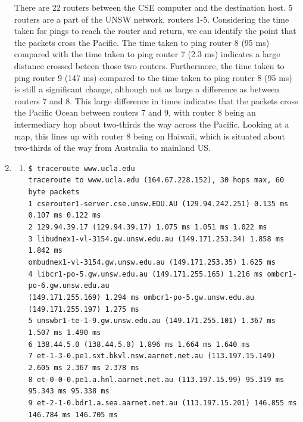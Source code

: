 \documentclass[a4paper,11pt]{article}
\newcommand{\code}{\texttt}
\begin{document}
\begin{enumerate}[leftmargin=*]
	There are 22 routers between the CSE computer and the destination host. 5 routers are a part of the UNSW network, routers 1-5. Considering the time taken for pings to reach the router and return, we can identify the point that the packets cross the Pacific. The time taken to ping router 8 (95 ms) compared with the time taken to ping router 7 (2.3 ms) indicates a large distance crossed beteen those two routers. Furthermore, the time taken to ping router 9 (147 ms) compared to the time taken to ping router 8 (95 ms) is still a significant change, although not as large a difference as between routers 7 and 8. This large difference in times indicates that the packets cross the Pacific Ocean between routers 7 and 9, with router 8 being an intermediary hop about two-thirds the way across the Pacific. Looking at a map, this lines up with router 8 being on Haiwaii, which is situated about two-thirds of the way from Australia to mainland US.
	\item 
		\begin{enumerate}
			\item \code{\scriptsize \$ traceroute www.ucla.edu\\
			traceroute to www.ucla.edu (164.67.228.152), 30 hops max, 60 byte packets\\
			 1  cserouter1-server.cse.unsw.EDU.AU (129.94.242.251)  0.135 ms  0.107 ms  0.122 ms\\
			 2  129.94.39.17 (129.94.39.17)  1.075 ms  1.051 ms  1.022 ms\\
			 3  libudnex1-vl-3154.gw.unsw.edu.au (149.171.253.34)  1.858 ms  1.842 ms\\
			 ombudnex1-vl-3154.gw.unsw.edu.au (149.171.253.35)  1.625 ms\\
			 4  libcr1-po-5.gw.unsw.edu.au (149.171.255.165)  1.216 ms ombcr1-po-6.gw.unsw.edu.au\\
			 (149.171.255.169)  1.294 ms ombcr1-po-5.gw.unsw.edu.au (149.171.255.197)  1.275 ms\\
			 5  unswbr1-te-1-9.gw.unsw.edu.au (149.171.255.101)  1.367 ms  1.507 ms  1.490 ms\\
			 6  138.44.5.0 (138.44.5.0)  1.896 ms  1.664 ms  1.640 ms\\
			 7  et-1-3-0.pe1.sxt.bkvl.nsw.aarnet.net.au (113.197.15.149)  2.605 ms  2.367 ms  2.378 ms\\
			 8  et-0-0-0.pe1.a.hnl.aarnet.net.au (113.197.15.99)  95.319 ms  95.343 ms  95.338 ms\\
			 9  et-2-1-0.bdr1.a.sea.aarnet.net.au (113.197.15.201)  146.855 ms  146.784 ms  146.705 ms\\
}
\end{enumerate}
\end{enumerate}
\end{document}
